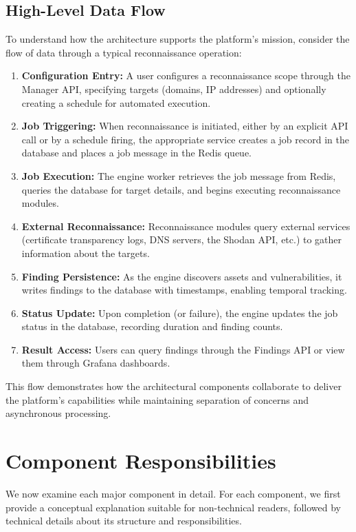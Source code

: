 \documentclass[a4paper,12pt]{report}
\begin{document}
\subsection{High-Level Data Flow}

To understand how the architecture supports the platform's mission, consider the flow of data through a typical reconnaissance operation:\hfill

\begin{enumerate}
\item \textbf{Configuration Entry:} A user configures a reconnaissance scope through the Manager API, specifying targets (domains, IP addresses) and optionally creating a schedule for automated execution.
\item \textbf{Job Triggering:} When reconnaissance is initiated, either by an explicit API call or by a schedule firing, the appropriate service creates a job record in the database and places a job message in the Redis queue.
\item \textbf{Job Execution:} The engine worker retrieves the job message from Redis, queries the database for target details, and begins executing reconnaissance modules.
\item \textbf{External Reconnaissance:} Reconnaissance modules query external services (certificate transparency logs, DNS servers, the Shodan API, etc.) to gather information about the targets.
\item \textbf{Finding Persistence:} As the engine discovers assets and vulnerabilities, it writes findings to the database with timestamps, enabling temporal tracking.
\item \textbf{Status Update:} Upon completion (or failure), the engine updates the job status in the database, recording duration and finding counts.
\item \textbf{Result Access:} Users can query findings through the Findings API or view them through Grafana dashboards.
\end{enumerate}

This flow demonstrates how the architectural components collaborate to deliver the platform's capabilities while maintaining separation of concerns and asynchronous processing.\hfill \break

\section{Component Responsibilities}

We now examine each major component in detail. For each component, we first provide a conceptual explanation suitable for non-technical readers, followed by technical details about its structure and responsibilities.
\end{document}
